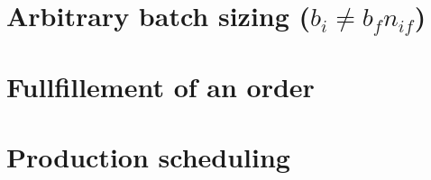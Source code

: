 \documentclass{report}
\begin{document}
    \chapter{Arbitrary batch sizing ($b_i \ne b_fn_{if}$)}
    

    \chapter{Fullfillement of an order}
    

    \chapter{Production scheduling}
    
\end{document}
